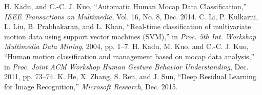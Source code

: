 \documentclass[letterpaper, 10pt, conference]{ieeeconf}
\begin{document}
\begin{thebibliography}{99}

 H. Kadu, and C.-C. J. Kuo, “Automatic Human Mocap Data Classification,” \textit{IEEE Transactions on Multimedia}, Vol. 16, No. 8, Dec. 2014.
 C. Li, P. Kulkarni, L. Liu, B. Prabhakaran, and L. Khan, “Real-time classification of multivariate motion data using support vector machines (SVM),” in \textit{Proc. 5th Int. Workshop Multimedia Data Mining}, 2004, pp. 1–7.
 H. Kadu, M. Kuo, and C.-C. J. Kuo, “Human motion classification and management based on mocap data analysis,” in \textit{Proc. Joint ACM Workshop Human Gesture Behavior Understanding}, Dec. 2011, pp. 73–74.
 K. He, X. Zhang, S. Ren, and J. Sun, “Deep Residual Learning for Image Recognition,” \textit{Microsoft Research}, Dec. 2015.

\end{thebibliography}
\end{document}

